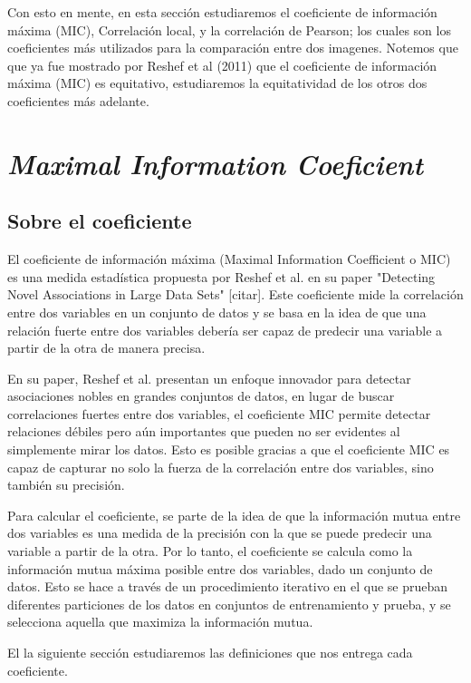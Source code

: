 Con esto en mente, en esta secci\'on estudiaremos el coeficiente de informaci\'on m\'axima (MIC), Correlaci\'on local, y la correlaci\'on de Pearson; los cuales son los coeficientes m\'as utilizados para la comparaci\'on entre dos imagenes. Notemos que que ya fue mostrado por Reshef et al (2011) que el coeficiente de informaci\'on m\'axima (MIC) es equitativo, estudiaremos la equitatividad de los otros dos coeficientes m\'as adelante.

\section[]{\textit{Maximal Information Coeficient}}

\subsection{Sobre el coeficiente}

	El coeficiente de informaci\'on m\'axima (Maximal Information Coefficient o MIC) es una medida estad\'istica propuesta por Reshef et al. en su paper "Detecting Novel Associations in Large Data Sets" [citar]. Este coeficiente mide la correlaci\'on entre dos variables en un conjunto de datos y se basa en la idea de que una relaci\'on fuerte entre dos variables deber\'ia ser capaz de predecir una variable a partir de la otra de manera precisa.

	En su paper, Reshef et al. presentan un enfoque innovador para detectar asociaciones nobles en grandes conjuntos de datos, en lugar de buscar correlaciones fuertes entre dos variables, el coeficiente MIC permite detectar relaciones d\'ebiles pero a\'un importantes que pueden no ser evidentes al simplemente mirar los datos. Esto es posible gracias a que el coeficiente MIC es capaz de capturar no solo la fuerza de la correlaci\'on entre dos variables, sino tambi\'en su precisi\'on.

	Para calcular el coeficiente, se parte de la idea de que la informaci\'on mutua entre dos variables es una medida de la precisi\'on con la que se puede predecir una variable a partir de la otra. Por lo tanto, el coeficiente se calcula como la informaci\'on mutua m\'axima posible entre dos variables, dado un conjunto de datos. Esto se hace a trav\'es de un procedimiento iterativo en el que se prueban diferentes particiones de los datos en conjuntos de entrenamiento y prueba, y se selecciona aquella que maximiza la informaci\'on mutua.

	El la siguiente secci\'on estudiaremos las definiciones que nos entrega cada coeficiente.
 
